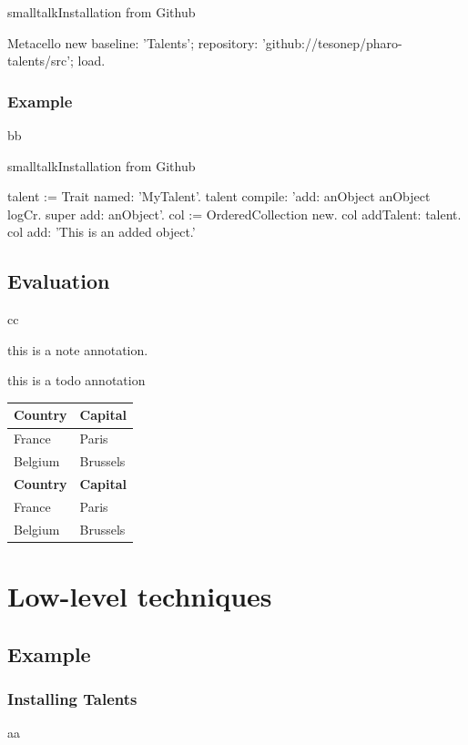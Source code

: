 \documentclass[10pt,twoside,english]{_support/latex/sbabook/sbabook}
\begin{document}
\begin{listing}[float, label=install]{smalltalk}{Installation from Github}

Metacello new
  baseline: 'Talents';
  repository: 'github://tesonep/pharo-talents/src';
  load.
\end{listing}
\subsection{Example}
bb

\begin{listing}[float, label=talent-example]{smalltalk}{Installation from Github}

talent := Trait named: 'MyTalent'.
talent compile: 'add: anObject
anObject logCr.
super add: anObject'.
col := OrderedCollection new.
col addTalent: talent.
col add: 'This is an added object.'
\end{listing}
\section{Evaluation}
cc

\begin{note}
this is a note annotation.
\end{note}

\begin{todo}
this is a todo annotation
\end{todo}

\begin{tabular}{ll}
\toprule
\textbf{Country} & \textbf{Capital} \\
\midrule
France & Paris \\
Belgium & Brussels \\
\textbf{Country} & \textbf{Capital} \\
\midrule
France & Paris \\
Belgium & Brussels \\
\bottomrule
\end{tabular}
\chapter{Low-level techniques}\section{Example}\subsection{Installing Talents}
aa
\end{document}
